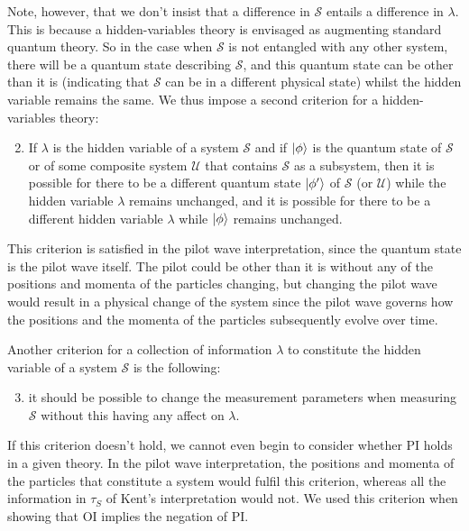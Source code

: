 Note, however, that we don't insist that a difference in $\mathcal{S}$ entails a difference in $\lambda$. This is because a hidden-variables theory is envisaged as augmenting standard quantum theory. So in the case when $\mathcal{S}$ is not entangled with any other system, there will be a quantum state describing $\mathcal{S}$, and this quantum state can be other than it is (indicating that $\mathcal{S}$ can be in a different physical state)  whilst the hidden variable remains the same. We thus impose a second criterion for a hidden-variables theory:
\begin{enumerate}
	\setcounter{enumi}{1}
	\item \label{hidden3} If $\lambda$ is the hidden variable of a system $\mathcal{S}$ and if $\ket{\phi}$ is the quantum state of $\mathcal{S}$ or of some composite system $\mathcal{U}$ that contains $\mathcal{S}$ as a subsystem, then it is possible for there to be a different quantum state $\ket{\phi'}$ of $\mathcal{S}$ (or $\mathcal{U}$) while the hidden variable $\lambda$ remains unchanged, and it is possible for there to be a different hidden variable $\lambda$ while $\ket{\phi}$ remains unchanged.
\end{enumerate}
This criterion is satisfied in the pilot wave interpretation, since the quantum state is the pilot wave itself. The pilot could be other than it is without any of the positions and momenta of the particles changing, but changing the pilot wave would result in a physical change of the system since the pilot wave governs how  the positions and the momenta of the particles subsequently evolve over time.

Another criterion for a collection of information $\lambda$ to constitute the hidden variable of a system $\mathcal{S}$ is the following: 
\begin{enumerate}
	\setcounter{enumi}{2}
\item \label{hidden2} it should be possible to change the measurement parameters when measuring $\mathcal{S}$ without this having any affect on $\lambda$. 
\end{enumerate} 
If this criterion doesn't hold, we cannot even begin to consider whether PI holds in a given theory. In the pilot wave interpretation, the positions and momenta of the particles that constitute a system would fulfil this criterion, whereas all the information in $\tau_S$ of Kent's interpretation would not. We used this criterion when showing that OI implies the negation of PI. 

